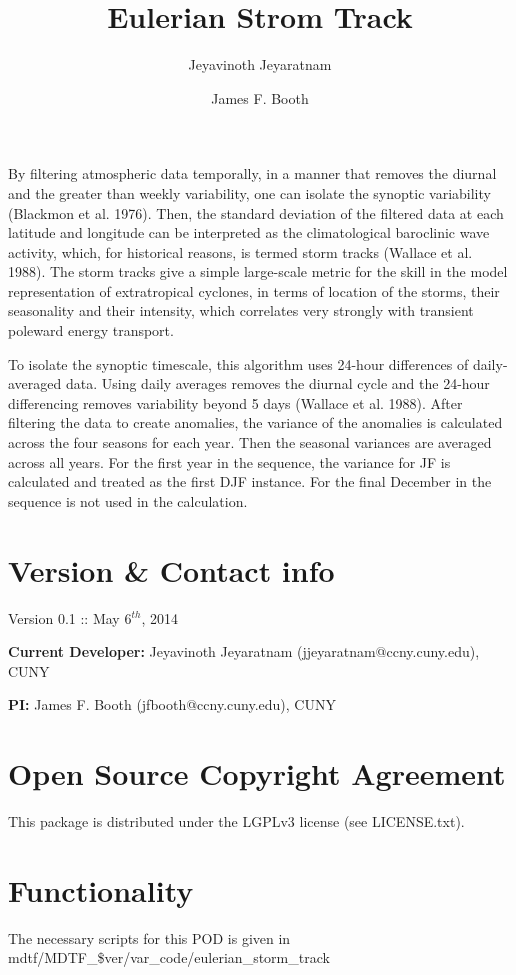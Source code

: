 \documentclass{article}
\title{Eulerian Strom Track}
\author[1]{Jeyavinoth Jeyaratnam}
\author[1]{James F. Booth}
\affil[1]{The City College of New York, CUNY, New York}
\begin{document}
\maketitle

\noindent
By filtering atmospheric data temporally, in a manner that removes the diurnal and the greater than weekly variability, one can isolate the synoptic variability (Blackmon et al. 1976). Then, the standard deviation of the filtered data at each latitude and longitude can be interpreted as the climatological baroclinic wave activity, which, for historical reasons, is termed storm tracks (Wallace et al. 1988). The storm tracks give a simple large-scale metric for the skill in the model representation of extratropical cyclones, in terms of location of the storms, their seasonality and their intensity, which correlates very strongly with transient poleward energy transport.

\hfill

\noindent
To isolate the synoptic timescale, this algorithm uses 24-hour differences of daily-averaged data. Using daily averages removes the diurnal cycle and the 24-hour differencing removes variability beyond 5 days (Wallace et al. 1988). After filtering the data to create anomalies, the variance of the anomalies is calculated across the four seasons for each year. Then the seasonal variances are averaged across all years. For the first year in the sequence, the variance for JF is calculated and treated as the first DJF instance. For the final December in the sequence is not used in the calculation.


\section*{Version \& Contact info}

\noindent
Version 0.1 :: May 6$^{th}$, 2014

\noindent
{\bf Current Developer:} Jeyavinoth Jeyaratnam (jjeyaratnam@ccny.cuny.edu), CUNY

\noindent
{\bf PI:} James F. Booth (jfbooth@ccny.cuny.edu), CUNY


\section*{Open Source Copyright Agreement}
\noindent
This package is distributed under the LGPLv3 license (see LICENSE.txt).

\section*{Functionality}
\noindent
The necessary scripts for this POD is given in mdtf/MDTF\_\$ver/var\_code/eulerian\_storm\_track
\end{document}
